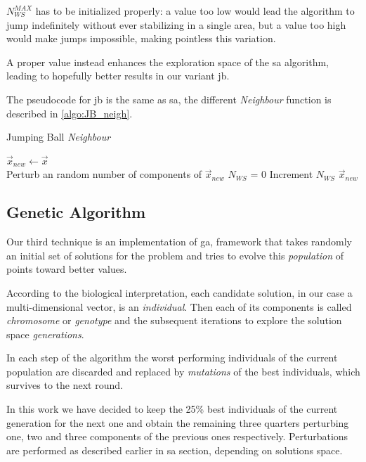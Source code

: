 \documentclass[12pt,journal,draftclsnofoot,onecolumn]{IEEEtran}
\begin{document}
$N_{WS}^{MAX}$ has to be initialized properly: a value too low would lead the algorithm to jump indefinitely without ever stabilizing in a single area, but a value too high would make jumps impossible, making pointless this variation.

A proper value instead enhances the exploration space of the \gls{sa} algorithm, leading to hopefully better results in our variant \gls{jb}.

The pseudocode for \gls{jb} is the same as \gls{sa}, the different \emph{Neighbour} function is described in \autoref{algo:JB_neigh}.

\begin{algorithm}
	\caption{Jumping Ball \emph{Neighbour}}\label{algo:JB_neigh}
	 {
		$\vec{x}_{new} \gets \vec{x}$ \\
		 {
			 {
				Perturb an random number of components of $\vec{x}_{new}$
			}
			$N_{WS}$ = 0
		}
	}
	 {
		Increment $N_{WS}$
	}
	\Return $\vec{x}_{new}$
\end{algorithm}

\subsection{Genetic Algorithm}

Our third technique is an implementation of \gls{ga}, framework that takes randomly an initial set of solutions for the problem and tries to evolve this \emph{population} of points toward better values.

According to the biological interpretation, each candidate solution, in our case a multi-dimensional vector, is an \emph{individual}.
Then each of its components is called \emph{chromosome} or \emph{genotype} and the subsequent iterations to explore the solution space \emph{generations}.

In each step of the algorithm the worst performing individuals of the current population are discarded and replaced by \emph{mutations} of the best individuals, which survives to the next round.

In this work we have decided to keep the 25\% best individuals of the current generation for the next one and obtain the remaining three quarters perturbing one, two and three components of the previous ones respectively. Perturbations are performed as described earlier in \gls{sa} section, depending on solutions space.
\end{document}
